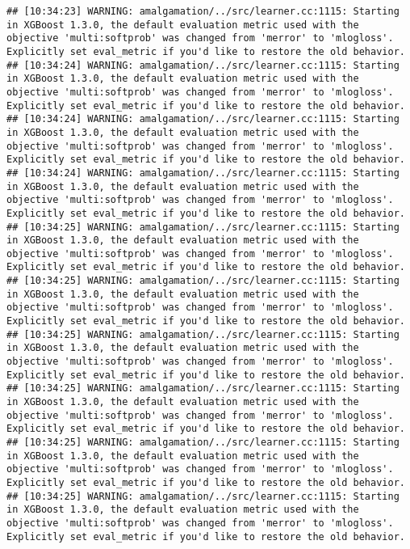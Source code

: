 \documentclass[
]{scrbook}
\begin{document}
\begin{verbatim}
## [10:34:23] WARNING: amalgamation/../src/learner.cc:1115: Starting in XGBoost 1.3.0, the default evaluation metric used with the objective 'multi:softprob' was changed from 'merror' to 'mlogloss'. Explicitly set eval_metric if you'd like to restore the old behavior.
## [10:34:24] WARNING: amalgamation/../src/learner.cc:1115: Starting in XGBoost 1.3.0, the default evaluation metric used with the objective 'multi:softprob' was changed from 'merror' to 'mlogloss'. Explicitly set eval_metric if you'd like to restore the old behavior.
## [10:34:24] WARNING: amalgamation/../src/learner.cc:1115: Starting in XGBoost 1.3.0, the default evaluation metric used with the objective 'multi:softprob' was changed from 'merror' to 'mlogloss'. Explicitly set eval_metric if you'd like to restore the old behavior.
## [10:34:24] WARNING: amalgamation/../src/learner.cc:1115: Starting in XGBoost 1.3.0, the default evaluation metric used with the objective 'multi:softprob' was changed from 'merror' to 'mlogloss'. Explicitly set eval_metric if you'd like to restore the old behavior.
## [10:34:25] WARNING: amalgamation/../src/learner.cc:1115: Starting in XGBoost 1.3.0, the default evaluation metric used with the objective 'multi:softprob' was changed from 'merror' to 'mlogloss'. Explicitly set eval_metric if you'd like to restore the old behavior.
## [10:34:25] WARNING: amalgamation/../src/learner.cc:1115: Starting in XGBoost 1.3.0, the default evaluation metric used with the objective 'multi:softprob' was changed from 'merror' to 'mlogloss'. Explicitly set eval_metric if you'd like to restore the old behavior.
## [10:34:25] WARNING: amalgamation/../src/learner.cc:1115: Starting in XGBoost 1.3.0, the default evaluation metric used with the objective 'multi:softprob' was changed from 'merror' to 'mlogloss'. Explicitly set eval_metric if you'd like to restore the old behavior.
## [10:34:25] WARNING: amalgamation/../src/learner.cc:1115: Starting in XGBoost 1.3.0, the default evaluation metric used with the objective 'multi:softprob' was changed from 'merror' to 'mlogloss'. Explicitly set eval_metric if you'd like to restore the old behavior.
## [10:34:25] WARNING: amalgamation/../src/learner.cc:1115: Starting in XGBoost 1.3.0, the default evaluation metric used with the objective 'multi:softprob' was changed from 'merror' to 'mlogloss'. Explicitly set eval_metric if you'd like to restore the old behavior.
## [10:34:25] WARNING: amalgamation/../src/learner.cc:1115: Starting in XGBoost 1.3.0, the default evaluation metric used with the objective 'multi:softprob' was changed from 'merror' to 'mlogloss'. Explicitly set eval_metric if you'd like to restore the old behavior.

\end{verbatim}
\end{document}
